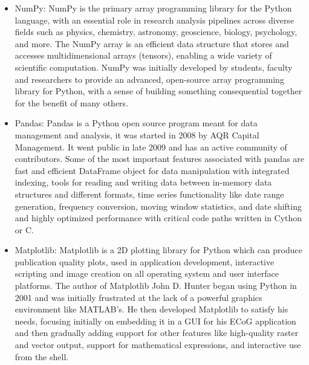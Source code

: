 \begin{itemize}
	\item NumPy: NumPy is the primary array programming library for the Python language, with an essential role in research analysis pipelines across diverse fields such as physics, chemistry, astronomy, geoscience, biology, psychology, and more. The NumPy array is an efficient data structure that stores and accesses multidimensional arrays (tensors), enabling a wide variety of scientific computation. NumPy was initially developed by students, faculty and researchers to provide an advanced, open-source array programming library for Python, with a sense of building something consequential together for the benefit of many others. \cite{python}



	\item Pandas: Pandas is a Python open source program meant for data management and analysis, it was started in 2008 by AQR Capital Management. It went public in late 2009 and has an active community of contributors. Some of the most important features associated with pandas are fast and efficient DataFrame object for data manipulation with integrated indexing, tools for reading and writing data between in-memory data structures and different formats, time series functionality like date range generation, frequency conversion, moving window statistics, and date shifting and highly optimized performance with critical code paths written in Cython or C. \cite{pandas}
	

	
	\item Matplotlib: Matplotlib is a 2D plotting library for Python which can produce publication quality plots, used in application development, interactive scripting and image creation on all operating system and user interface platforms. The author of Matplotlib John D. Hunter began using Python in 2001 and was initially frustrated at the lack of a powerful graphics environment like MATLAB's. He then developed Matplotlib to satisfy his needs, focusing initially on embedding it in a GUI for his ECoG application and then gradually adding support for other features like high-quality raster and vector output, support for mathematical expressions, and interactive use from the shell.\cite{plot}



\end{itemize}
